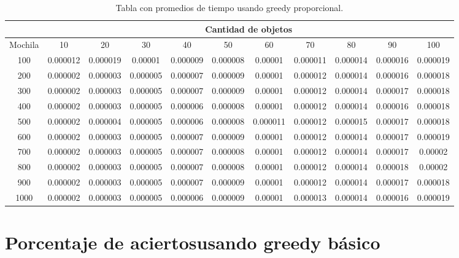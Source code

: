 \documentclass[a4paper]{article}
\begin{document}
\begin{table}[H]
\centering
\relax
\resizebox{\textwidth}{!} {%
\begin{tabular}{|c|c|c|c|c|c|c|c|c|c|c|}
\cline{2-11}
 \multicolumn{1}{c}{} & \multicolumn{10}{|c|}{\textbf{Cantidad de objetos}} \\
\hline
Mochila & 10 & 20 & 30 & 40 & 50 & 60 & 70 & 80 & 90 & 100 \\
\hline
\hline
100 & 0.000012 & 0.000019 & 0.00001 & 0.000009 & 0.000008 & 0.00001 & 0.000011 & 0.000014 & 0.000016 & 0.000019 \\
\hline
\hline
200 & 0.000002 & 0.000003 & 0.000005 & 0.000007 & 0.000009 & 0.00001 & 0.000012 & 0.000014 & 0.000016 & 0.000018 \\
\hline
\hline
300 & 0.000002 & 0.000003 & 0.000005 & 0.000007 & 0.000009 & 0.00001 & 0.000012 & 0.000014 & 0.000017 & 0.000018 \\
\hline
\hline
400 & 0.000002 & 0.000003 & 0.000005 & 0.000006 & 0.000008 & 0.00001 & 0.000012 & 0.000014 & 0.000016 & 0.000018 \\
\hline
\hline
500 & 0.000002 & 0.000004 & 0.000005 & 0.000006 & 0.000008 & 0.000011 & 0.000012 & 0.000015 & 0.000017 & 0.000018 \\
\hline
\hline
600 & 0.000002 & 0.000003 & 0.000005 & 0.000007 & 0.000009 & 0.00001 & 0.000012 & 0.000014 & 0.000017 & 0.000019 \\
\hline
\hline
700 & 0.000002 & 0.000003 & 0.000005 & 0.000007 & 0.000008 & 0.00001 & 0.000012 & 0.000014 & 0.000017 & 0.00002 \\
\hline
\hline
800 & 0.000002 & 0.000003 & 0.000005 & 0.000007 & 0.000008 & 0.00001 & 0.000012 & 0.000014 & 0.000018 & 0.00002 \\
\hline
\hline
900 & 0.000002 & 0.000003 & 0.000005 & 0.000007 & 0.000009 & 0.00001 & 0.000012 & 0.000014 & 0.000017 & 0.000018 \\
\hline
\hline
1000 & 0.000002 & 0.000003 & 0.000005 & 0.000006 & 0.000009 & 0.00001 & 0.000013 & 0.000014 & 0.000016 & 0.000019 \\
\hline
\end{tabular}%
}
\caption{Tabla con promedios de tiempo usando greedy proporcional.}
\end{table}
\section{Porcentaje de aciertosusando greedy básico}
\end{document}
